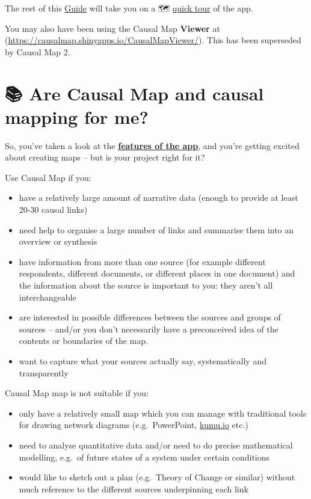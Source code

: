 \documentclass[
]{book}
\providecommand{\tightlist}{%
  \setlength{\itemsep}{0pt}\setlength{\parskip}{0pt}}
\begin{document}
The rest of this \href{guide.causalmap.app}{Guide} will take you on a 🗺 \protect\hyperlink{quick-tour}{quick tour} of the app.

You may also have been using the Causal Map \textbf{Viewer} at (\url{https://causalmap.shinyapps.io/CausalMapViewer/}). This has been superseded by Causal Map 2.

\hypertarget{are-causal-map-and-causal-mapping-for-me}{%
\chapter{📚 Are Causal Map and causal mapping for me?}\label{are-causal-map-and-causal-mapping-for-me}}

So, you've taken a look at the \textbf{\href{https://causalmap.app/the-app/}{features of the app}}, and you're getting excited about creating maps -- but is your project right for it?

Use Causal Map if you:

\begin{itemize}
\tightlist
\item
  have a relatively large amount of narrative data (enough to provide at least 20-30 causal links)
\item
  need help to organise a large number of links and summarise them into an overview or synthesis
\item
  have information from more than one source (for example different respondents, different documents, or different places in one document) and the information about the source is important to you: they aren't all interchangeable
\item
  are interested in possible differences between the sources and groups of sources -- and/or you don't necessarily have a preconceived idea of the contents or boundaries of the map.
\item
  want to capture what your sources actually say, systematically and transparently
\end{itemize}

Causal Map map is not suitable if you:

\begin{itemize}
\tightlist
\item
  only have a relatively small map which you can manage with traditional tools for drawing network diagrams (e.g.~PowerPoint, \href{http://kumu.io}{kumu.io} etc.)
\item
  need to analyse quantitative data and/or need to do precise mathematical modelling, e.g.~of future states of a system under certain conditions
\item
  would like to sketch out a plan (e.g.~Theory of Change or similar) without much reference to the different sources underpinning each link
\end{itemize}
\end{document}

